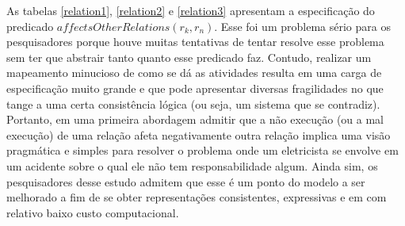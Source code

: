 As tabelas \ref{relation1}, \ref{relation2} e \ref{relation3} apresentam a especificação do predicado $affectsOtherRelations(r_k,r_n)$. Esse foi um problema sério para os pesquisadores porque 
houve muitas tentativas de tentar resolve esse problema sem ter que abstrair tanto quanto esse predicado faz. Contudo, realizar um mapeamento minucioso de como se dá as atividades resulta 
em uma carga de especificação muito grande e que pode apresentar diversas fragilidades no que tange a uma certa consistência lógica (ou seja, um sistema que se contradiz). Portanto, 
em uma primeira abordagem admitir que a não execução (ou a mal execução) de uma relação afeta negativamente outra relação implica uma visão pragmática e simples para resolver o problema 
onde um eletricista se envolve em um acidente sobre o qual ele não tem responsabilidade algum. Ainda sim, os pesquisadores desse estudo admitem que esse é um ponto do modelo a ser melhorado 
a fim de se obter representações consistentes, expressivas e em com relativo baixo custo computacional. 

